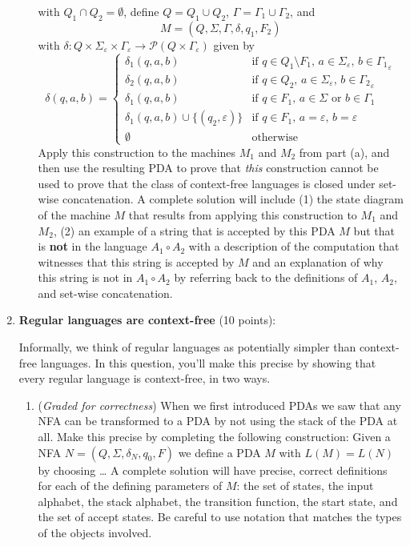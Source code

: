 \documentclass[12pt, oneside]{article}
\newcommand{\gradeCorrect}{({\it Graded for correctness}) }
\begin{document}
\begin{enumerate}[wide, labelwidth=!, labelindent=0pt]
\begin{enumerate}
    with $Q_1 \cap Q_2 = \emptyset$, define $Q = Q_1 \cup Q_2$, $\Gamma = \Gamma_1 \cup \Gamma_2$, and
    $$M = (Q, \Sigma, \Gamma, \delta, q_1, F_2)$$ with 
    $\delta: Q \times \Sigma_\varepsilon \times \Gamma_\varepsilon \to \mathcal{P}(Q \times \Gamma_\varepsilon)$
    given by 
    $$\delta( q,a,b) = \begin{cases}
        \delta_1 (q,a,b) &\text{if $q \in Q_1 \setminus F_1$, $a \in \Sigma_\varepsilon$, $b \in {\Gamma_1}_\varepsilon$} \\
        \delta_2 (q,a,b) &\text{if $q \in Q_2$, $a \in \Sigma_\varepsilon$, $b \in {\Gamma_2}_\varepsilon$} \\
        \delta_1 (q,a,b) &\text{if $q \in F_1$, $a \in \Sigma$ or $b\in \Gamma_1$}\\
        \delta_1 (q,a,b) \cup \{ (q_2, \varepsilon)\} &\text{if $q \in F_1$, $a =\varepsilon$, $b=\varepsilon$}\\
        \emptyset &\text{otherwise}
    \end{cases}$$
    Apply this construction to the machines $M_1$ and $M_2$ from part (a), and then use the resulting PDA to prove that 
    {\it this} construction cannot be used to prove that the class of context-free languages is closed under set-wise
    concatenation. A complete solution will include (1) the state diagram of the machine $M$ that results from 
    applying this construction to $M_1$ and $M_2$, (2) an example of a string that is accepted by this PDA $M$ but that 
    is {\bf not} in the language $A_1 \circ A_2$ with a description of the computation that witnesses that this string 
    is accepted by $M$ and an explanation of why this string is not in $A_1 \circ A_2$ by referring back to the definitions
    of $A_1$, $A_2$, and set-wise concatenation.
\end{enumerate}

\item\textbf{Regular languages are context-free} (10 points):

Informally, we think of regular languages as potentially simpler than context-free languages. In this question, you'll make 
this precise by showing that every regular language is context-free, in two ways.
\begin{enumerate}
\item\gradeCorrect When we first introduced PDAs we saw that any NFA can be transformed to a PDA by not using the stack 
of the PDA at all. Make this precise by completing the following construction: Given a NFA $N = (Q, \Sigma, \delta_N, q_0, F)$
we define a PDA $M$ with $L(M) = L(N)$ by choosing \ldots
A complete solution will have precise, correct definitions for each of the defining parameters of $M$: the set of states,
the input alphabet, the stack alphabet, the transition function, the start state, and the set of accept states. Be careful
to use notation that matches the types of the objects involved.


\end{enumerate}
\end{enumerate}
\end{document}
